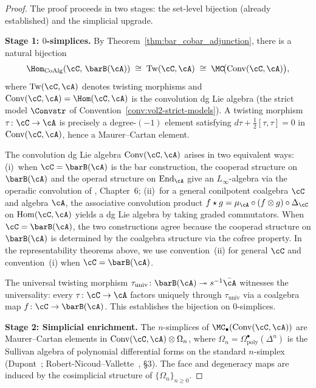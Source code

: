 \begin{proof}
The proof proceeds in two stages: the set-level bijection
(already established) and the simplicial upgrade.

\medskip\noindent
\textbf{Stage 1: $0$-simplices.}
By Theorem~\ref{thm:bar_cobar_adjunction}, there is a natural
bijection
\[
\Hom_{\mathrm{CoAlg}}(\cC,\, \barB(\cA))
\;\cong\;
\mathrm{Tw}(\cC, \cA)
\;\cong\;
\MC\!\bigl(\mathrm{Conv}(\cC, \cA)\bigr),
\]
where $\mathrm{Tw}(\cC, \cA)$ denotes twisting morphisms and
$\mathrm{Conv}(\cC, \cA)
= \Hom(\cC, \cA)$ is the convolution dg Lie algebra
(the strict model $\Convstr$ of
Convention~\ref{conv:vol2-strict-models}). A twisting morphism
$\tau\colon \cC \to \cA$ is precisely a degree-$(-1)$ element
satisfying $d\tau + \frac{1}{2}[\tau,\tau] = 0$ in
$\mathrm{Conv}(\cC, \cA)$, hence a Maurer--Cartan element.

\begin{remark}
\label{rem:two-convolutions}
The convolution dg Lie algebra $\mathrm{Conv}(\cC, \cA)$ arises in two equivalent ways: (i)~when $\cC = \barB(\cA)$ is the bar construction, the cooperad structure on $\barB(\cA)$ and the operad structure on $\mathrm{End}_\cA$ give an $L_\infty$-algebra via the operadic convolution of \cite{LV12}, Chapter~6; (ii)~for a general conilpotent coalgebra $\cC$ and algebra $\cA$, the associative convolution product $f \star g = \mu_\cA \circ (f \otimes g) \circ \Delta_\cC$ on $\mathrm{Hom}(\cC, \cA)$ yields a dg Lie algebra by taking graded commutators. When $\cC = \barB(\cA)$, the two constructions agree because the cooperad structure on $\barB(\cA)$ is determined by the coalgebra structure via the cofree property. In the representability theorems above, we use convention~(ii) for general $\cC$ and convention~(i) when $\cC = \barB(\cA)$.
\end{remark}

The universal twisting morphism
$\tau_{\mathrm{univ}}\colon \barB(\cA) \twoheadrightarrow
s^{-1}\bar{\cA}$ witnesses the universality: every
$\tau\colon \cC \to \cA$ factors uniquely through
$\tau_{\mathrm{univ}}$ via a coalgebra map
$f\colon \cC \to \barB(\cA)$. This establishes the bijection on
$0$-simplices.

\medskip\noindent
\textbf{Stage 2: Simplicial enrichment.}
The $n$-simplices of $\MC_\bullet(\mathrm{Conv}(\cC, \cA))$
are Maurer--Cartan elements in
$\mathrm{Conv}(\cC, \cA) \otimes \Omega_n$,
where $\Omega_n = \Omega^\bullet_{\mathrm{poly}}(\Delta^n)$
is the Sullivan algebra of polynomial differential forms
on the standard $n$-simplex
(Dupont~\cite{Dup76}; Robert-Nicoud--Vallette~\cite{RNV20},
\S3). The face and degeneracy maps are induced by the
cosimplicial structure of $\{\Omega_n\}_{n \geq 0}$.


\end{proof}
